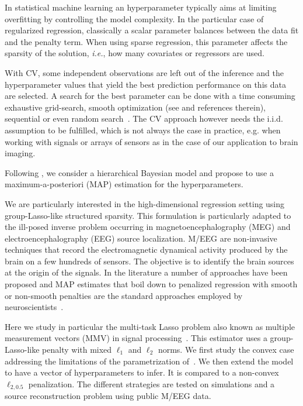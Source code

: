 In statistical machine learning an hyperparameter typically aims at limiting overfitting by controlling the model complexity. In the particular case of regularized regression, classically a scalar parameter balances between the data fit and the penalty term. When using sparse regression, this parameter affects the sparsity of the solution, \emph{i.e.}, how many covariates or regressors are used.

With CV, some independent observations are left out of the inference and the
hyperparameter values that yield the best prediction performance on this data are selected. A search for the best parameter can be done with a time consuming exhaustive grid-search, smooth optimization (see \cite{pedregosa2016hyperparameter} and references therein),
sequential or even random search~\cite{bergstra2011algorithms, bergstra2012random}. The CV approach however needs the i.i.d. assumption to be fulfilled, which is not always the case in practice, e.g. when working with signals or arrays of sensors as in the case of our application to brain imaging.

Following \cite{Figueiredo}, we consider a hierarchical Bayesian model and propose to use a maximum-a-posteriori (MAP) estimation for the hyperparameters.

We are particularly interested in the high-dimensional regression setting using group-Lasso-like structured sparsity. This formulation is particularly adapted to the ill-posed inverse problem occurring in magnetoencephalography (MEG) and electroencephalography (EEG) source localization. M/EEG are non-invasive techniques that record the electromagnetic dynamical activity produced by the brain on a few hundreds of sensors. The objective is to identify the brain sources at the origin of the signals. In the literature a number of approaches have been proposed and MAP estimates that boil down to penalized regression with smooth or non-smooth penalties are the standard approaches employed by neuroscientists~\cite{haufe2008combining,ou2009distributed, bolstad2009space, wipf2009unified,gramfort2012mixed,lucka2012hierarchical,valdes2009eeg}.

Here we study in particular the multi-task Lasso problem also known as multiple measurement vectors (MMV) in signal processing~\cite{cotter2005sparse}. This estimator uses a group-Lasso-like penalty with mixed $\ell_1$ and $\ell_2$ norms. We first study the convex case addressing the limitations of the parametrization of~\cite{Figueiredo}. We then extend the model to have a vector of hyperparameters to infer. It is compared to a non-convex $\ell_{2,0.5}$ penalization.
The different strategies are tested on simulations and a source reconstruction problem using public M/EEG data.

